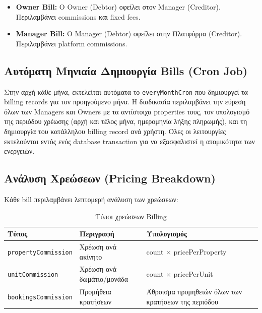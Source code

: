 \documentclass[
	12pt, %
	oneside, %
	greek,
	onehalfspacing, %
	liststotoc, %
	toctotoc, %
	parskip, %
	headsepline, %
]{MastersDoctoralThesis} %
\newcommand{\code}[1]{\texttt{#1}}
\begin{document}

\begin{itemize}
    \item \textbf{Owner Bill:} Ο Owner (Debtor) οφείλει στον Manager (Creditor). Περιλαμβάνει commissions και fixed fees.
    \item \textbf{Manager Bill:} Ο Manager (Debtor) οφείλει στην Πλατφόρμα (Creditor). Περιλαμβάνει platform commissions.
\end{itemize}

\subsection{Αυτόματη Μηνιαία Δημιουργία Bills (Cron Job)}
\label{subsec:monthly-bills}

Στην αρχή κάθε μήνα, εκτελείται αυτόματα το \code{everyMonthCron} που δημιουργεί τα billing records για τον προηγούμενο μήνα. Η διαδικασία περιλαμβάνει την εύρεση όλων των Managers και Owners με τα αντίστοιχα properties τους, τον υπολογισμό της περιόδου χρέωσης (αρχή και τέλος μήνα, ημερομηνία λήξης πληρωμής), και τη δημιουργία του κατάλληλου billing record ανά χρήστη. Όλες οι λειτουργίες εκτελούνται εντός ενός database transaction για να εξασφαλιστεί η ατομικότητα των ενεργειών.

\subsection{Ανάλυση Χρεώσεων (Pricing Breakdown)}
\label{subsec:pricing-breakdown}

Κάθε bill περιλαμβάνει λεπτομερή ανάλυση των χρεώσεων:

\begin{table}[H]
\centering
\caption{Τύποι χρεώσεων Billing}
\label{tab:billing-types}
\begin{tabular}{@{}lll@{}}
\toprule
\textbf{Τύπος} & \textbf{Περιγραφή} & \textbf{Υπολογισμός} \\
\midrule
\code{propertyCommission} & Χρέωση ανά ακίνητο & count $\times$ pricePerProperty \\
\code{unitCommission} & Χρέωση ανά δωμάτιο/μονάδα & count $\times$ pricePerUnit \\
\code{bookingsCommission} & Προμήθεια κρατήσεων & Άθροισμα προμηθειών όλων των κρατήσεων της περιόδου \\
\bottomrule
\end{tabular}
\end{table}
\end{document}
